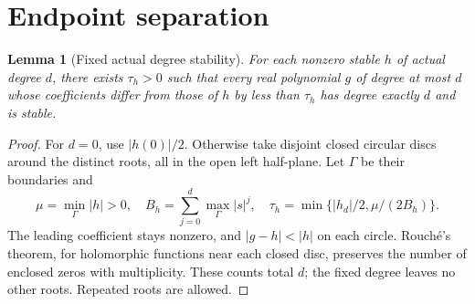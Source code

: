 \documentclass[11pt,a4paper]{article}
\newtheorem{lemma}[theorem]{Lemma}
\theoremstyle{definition}\newtheorem{definition}[theorem]{Definition}
\theoremstyle{remark}\newtheorem{remark}[theorem]{Remark}
\begin{document}
\section{Endpoint separation}\label{sec:endpoint}
\begin{lemma}[Fixed actual degree stability]\label{lem:fixeddegree}
For each nonzero stable $h$ of actual degree $d$, there exists
$\tau_h>0$ such that every real polynomial $g$ of degree at most $d$
whose coefficients differ from those of $h$ by less than $\tau_h$
has degree exactly $d$ and is stable.
\end{lemma}
\begin{proof}
For $d=0$, use $|h(0)|/2$. Otherwise take disjoint closed circular discs
around the distinct roots, all in the open left half-plane. Let $\Gamma$
be their boundaries and
\[
 \mu=\min_\Gamma|h|>0,\quad B_h=\sum_{j=0}^d\max_\Gamma|s|^j,
 \quad\tau_h=\min\{|h_d|/2,\mu/(2B_h)\}.
\]
The leading coefficient stays nonzero, and $|g-h|<|h|$ on each circle.
Rouch\'e's theorem, for holomorphic functions near each closed disc,
preserves the number of enclosed zeros with multiplicity. These counts
total $d$; the fixed degree leaves no other roots. Repeated roots are
allowed.
\end{proof}
\end{document}
